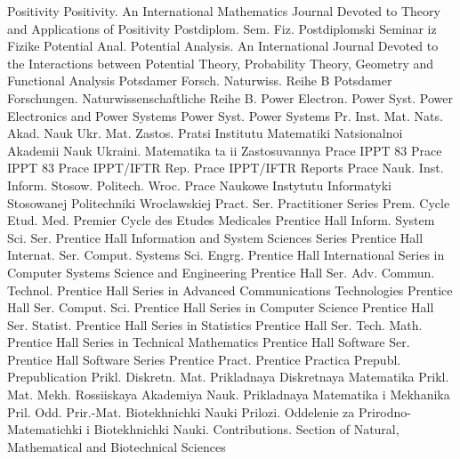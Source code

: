 {Positivity}
{Positivity. An International Mathematics Journal Devoted to Theory and Applications of Positivity}
{Postdiplom. Sem. Fiz.}
{Postdiplomski Seminar iz Fizike}
{Potential Anal.}
{Potential Analysis. An International Journal Devoted to the Interactions between Potential Theory, Probability Theory, Geometry and Functional Analysis}
{Potsdamer Forsch. Naturwiss. Reihe B}
{Potsdamer Forschungen. Naturwissenschaftliche Reihe B.}
{Power Electron. Power Syst.}
{Power Electronics and Power Systems}
{Power Syst.}
{Power Systems}
{Pr. Inst. Mat. Nats. Akad. Nauk Ukr. Mat. Zastos.}
{Pratsi Institutu Matematiki Natsionalnoi Akademii Nauk Ukraini. Matematika ta ii Zastosuvannya}
{Prace IPPT 83}
{Prace IPPT 83}
{Prace IPPT/IFTR Rep.}
{Prace IPPT/IFTR Reports}
{Prace Nauk. Inst. Inform. Stosow. Politech. Wroc.}
{Prace Naukowe Instytutu Informatyki Stosowanej Politechniki Wroclawskiej}
{Pract. Ser.}
{Practitioner Series}
{Prem. Cycle Etud. Med.}
{Premier Cycle des Etudes Medicales}
{Prentice Hall Inform. System Sci. Ser.}
{Prentice Hall Information and System Sciences Series}
{Prentice Hall Internat. Ser. Comput. Systems Sci. Engrg.}
{Prentice Hall International Series in Computer Systems Science and Engineering}
{Prentice Hall Ser. Adv. Commun. Technol.}
{Prentice Hall Series in Advanced Communications Technologies}
{Prentice Hall Ser. Comput. Sci.}
{Prentice Hall Series in Computer Science}
{Prentice Hall Ser. Statist.}
{Prentice Hall Series in Statistics}
{Prentice Hall Ser. Tech. Math.}
{Prentice Hall Series in Technical Mathematics}
{Prentice Hall Software Ser.}
{Prentice Hall Software Series}
{Prentice Pract.}
{Prentice Practica}
{Prepubl.}
{Prepublication}
{Prikl. Diskretn. Mat.}
{Prikladnaya Diskretnaya Matematika}
{Prikl. Mat. Mekh.}
{Rossiiskaya Akademiya Nauk. Prikladnaya Matematika i Mekhanika}
{Pril. Odd. Prir.-Mat. Biotekhnichki Nauki}
{Prilozi. Oddelenie za Prirodno-Matematichki i Biotekhnichki Nauki. Contributions. Section of Natural, Mathematical and Biotechnical Sciences}
